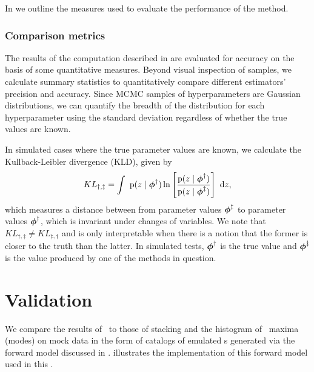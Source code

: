 In  we outline the measures used to evaluate the performance of the method.

\subsubsection{Comparison metrics}

The results of the computation described in  are evaluated for accuracy on the basis of some quantitative measures.  
Beyond visual inspection of samples, we calculate summary statistics to quantitatively compare different estimators' precision and accuracy.  
Since MCMC samples of hyperparameters are Gaussian distributions, we can quantify the breadth of the distribution for each hyperparameter using the standard deviation regardless of whether the true values are known.  

In simulated cases where the true parameter values are known, we calculate the Kullback-Leibler divergence (KLD), given by 
\begin{equation}
\eqlabel{eqn:kl}
KL_{\dagger,\ddagger} = \integral{\pr{z \gvn \ndphi^{\dagger}} \ln \left[ \frac{\pr{z \gvn \ndphi^{\dagger}}}{\pr{z \gvn \ndphi^{\ddagger}}} \right]}{z} ,
\end{equation}
which measures a distance between from parameter values ${\boldsymbol{\phi}}^{\ddagger}$ to parameter values ${\boldsymbol{\phi}}^{\dagger}$, which is invariant under changes of variables.  
We note that $KL_{\dagger,\ddagger} \neq KL_{\ddagger,\dagger}$ and is only interpretable when there is a notion that the former is closer to the truth than the latter.
In simulated tests, ${\boldsymbol{\phi}}^{\dagger}$ is the true value and ${\boldsymbol{\phi}}^{\ddagger}$ is the value produced by one of the methods in question.  

\section{Validation}

We compare the results of \Chippr\ to those of stacking and the histogram of \pzpdf\ maxima (modes) on mock data in the form of catalogs of emulated \pzpdf s generated via the forward model discussed in .
 illustrates the implementation of this forward model used in this \paper.

